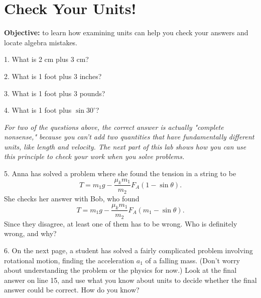 \section{Check Your Units!}

\makelabheader %


\vspace{0.1in}
\textbf{Objective:} to learn how examining units can help you check your answers and locate algebra mistakes. 
\bigskip

1. What is 2 cm plus 3 cm?
\vspace{0.2in}

2. What is 1 foot plus 3 inches?
\vspace{0.2in}

3. What is 1 foot plus 3 pounds?
\vspace{0.2in}

4. What is 1 foot plus $\sin 30 ^\circ $?
\vspace{0.2in}

\textit{For two of the questions above, the correct answer is actually "complete nonsense," because you can't add two quantities that have fundamentally different units, like length and velocity.  The next part of this lab shows how you can use this principle to check your work when you solve problems.}

5. Anna has solved a problem where she found the tension in a string to be 
$$T = m_1g - \frac{\mu_k m_1}{m_2} F_A (1 - \sin\theta).$$ 
She checks her answer with Bob, who found 
$$T = m_1g - \frac{\mu_k m_1}{m_2} F_A (m_1 - \sin\theta).$$ 
Since they disagree, at least one of them has to be wrong.  Who is definitely wrong, and why?
\vspace{0.7in}

6. On the next page, a student has solved a fairly complicated problem involving rotational motion, finding the acceleration $a_1$ of a falling mass. (Don't worry about understanding the problem or the physics for now.)  Look at the final answer on line 15, and use what you know about units to decide whether the final answer could be correct.  How do you know?
\vspace{0.7in}

